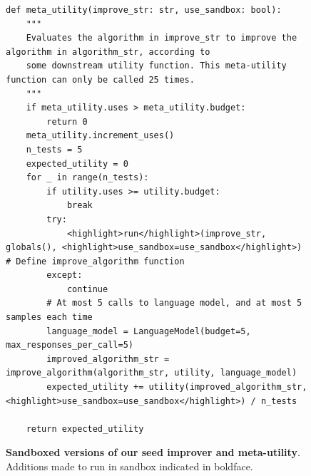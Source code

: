 \documentclass{article} %
\begin{document}
\begin{figure}[h]
\begin{mybox}
\begin{lstlisting}[style=mystyle]
def meta_utility(improve_str: str, use_sandbox: bool):
    """
    Evaluates the algorithm in improve_str to improve the algorithm in algorithm_str, according to
    some downstream utility function. This meta-utility function can only be called 25 times.
    """
    if meta_utility.uses > meta_utility.budget:
        return 0
    meta_utility.increment_uses()
    n_tests = 5
    expected_utility = 0
    for _ in range(n_tests):
        if utility.uses >= utility.budget:
            break
        try:
            <highlight>run</highlight>(improve_str, globals(), <highlight>use_sandbox=use_sandbox</highlight>)  # Define improve_algorithm function
        except:
            continue
        # At most 5 calls to language model, and at most 5 samples each time
        language_model = LanguageModel(budget=5, max_responses_per_call=5)
        improved_algorithm_str = improve_algorithm(algorithm_str, utility, language_model)
        expected_utility += utility(improved_algorithm_str, <highlight>use_sandbox=use_sandbox</highlight>) / n_tests

    return expected_utility\end{lstlisting}
\end{mybox}
\vspace{-6pt}


  
  \caption{\textbf{Sandboxed versions of our seed improver and meta-utility}. Additions made to run in sandbox indicated in boldface.} 
  \label{fig:unbox}
\end{figure}%
\end{document}

